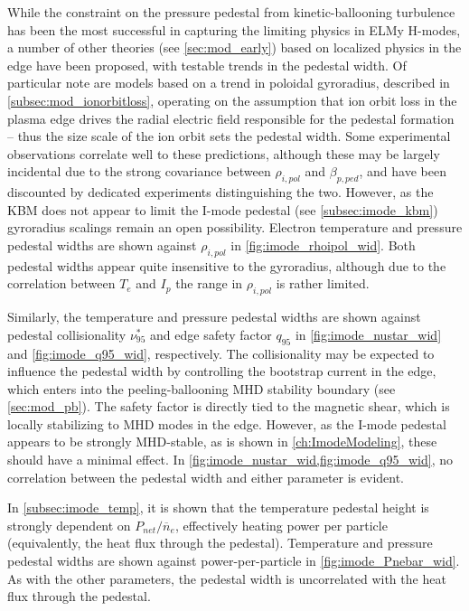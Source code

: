 While the constraint on the pressure pedestal from kinetic-ballooning turbulence has been the most successful in capturing the limiting physics in ELMy H-modes, a number of other theories (see \cref{sec:mod_early}) based on localized physics in the edge have been proposed, with testable trends in the pedestal width.  Of particular note are models based on a trend in poloidal gyroradius, described in \cref{subsec:mod_ionorbitloss}, operating on the assumption that ion orbit loss in the plasma edge drives the radial electric field responsible for the pedestal formation -- thus the size scale of the ion orbit sets the pedestal width.  Some experimental observations correlate well to these predictions, although these may be largely incidental due to the strong covariance between $\rho_{i,pol}$ and $\beta_{p,ped}$, and have been discounted by dedicated experiments distinguishing the two.  However, as the KBM does not appear to limit the I-mode pedestal (see \cref{subsec:imode_kbm}) gyroradius scalings remain an open possibility.  Electron temperature and pressure pedestal widths are shown against $\rho_{i,pol}$ in \cref{fig:imode_rhoipol_wid}.  Both pedestal widths appear quite insensitive to the gyroradius, although due to the correlation between $T_e$ and $I_p$ the range in $\rho_{i,pol}$ is rather limited.

Similarly, the temperature and pressure pedestal widths are shown against pedestal collisionality $\nu^*_{95}$ and edge safety factor $q_{95}$ in \cref{fig:imode_nustar_wid} and \cref{fig:imode_q95_wid}, respectively.  The collisionality may be expected to influence the pedestal width by controlling the bootstrap current in the edge, which enters into the peeling-ballooning MHD stability boundary (see \cref{sec:mod_pb}).  The safety factor is directly tied to the magnetic shear, which is locally stabilizing to MHD modes in the edge.  However, as the I-mode pedestal appears to be strongly MHD-stable, as is shown in \cref{ch:ImodeModeling}, these should have a minimal effect.  In \cref{fig:imode_nustar_wid,fig:imode_q95_wid}, no correlation between the pedestal width and either parameter is evident.

In \cref{subsec:imode_temp}, it is shown that the temperature pedestal height is strongly dependent on $P_{net}/\overline{n}_e$, effectively heating power per particle (equivalently, the heat flux through the pedestal).  Temperature and pressure pedestal widths are shown against power-per-particle in \cref{fig:imode_Pnebar_wid}.  As with the other parameters, the pedestal width is uncorrelated with the heat flux through the pedestal.

